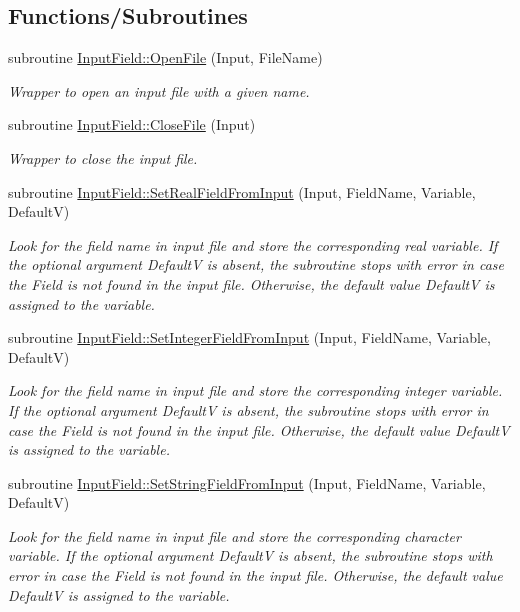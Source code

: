 \subsection*{Functions/Subroutines}
\begin{DoxyCompactItemize}
\item 
subroutine \hyperlink{namespace_input_field_ab4dd5bd42a4fe952b9d298c46d09ac20}{InputField::OpenFile} (Input, FileName)
\begin{DoxyCompactList}\small\item\em Wrapper to open an input file with a given name. \item\end{DoxyCompactList}\item 
subroutine \hyperlink{namespace_input_field_a2ff58fb6ffd3fe11782567af59bc26fa}{InputField::CloseFile} (Input)
\begin{DoxyCompactList}\small\item\em Wrapper to close the input file. \item\end{DoxyCompactList}\item 
subroutine \hyperlink{namespace_input_field_adc129418985de962f55e62964277411d}{InputField::SetRealFieldFromInput} (Input, FieldName, Variable, DefaultV)
\begin{DoxyCompactList}\small\item\em Look for the field name in input file and store the corresponding real variable. If the optional argument DefaultV is absent, the subroutine stops with error in case the Field is not found in the input file. Otherwise, the default value DefaultV is assigned to the variable. \item\end{DoxyCompactList}\item 
subroutine \hyperlink{namespace_input_field_ac3f69e3960e1f451a3e6fe072075f90f}{InputField::SetIntegerFieldFromInput} (Input, FieldName, Variable, DefaultV)
\begin{DoxyCompactList}\small\item\em Look for the field name in input file and store the corresponding integer variable. If the optional argument DefaultV is absent, the subroutine stops with error in case the Field is not found in the input file. Otherwise, the default value DefaultV is assigned to the variable. \item\end{DoxyCompactList}\item 
subroutine \hyperlink{namespace_input_field_a6238d310b4f7c163dd317b81bb279393}{InputField::SetStringFieldFromInput} (Input, FieldName, Variable, DefaultV)
\begin{DoxyCompactList}\small\item\em Look for the field name in input file and store the corresponding character variable. If the optional argument DefaultV is absent, the subroutine stops with error in case the Field is not found in the input file. Otherwise, the default value DefaultV is assigned to the variable. \item\end{DoxyCompactList}\end{DoxyCompactItemize}
